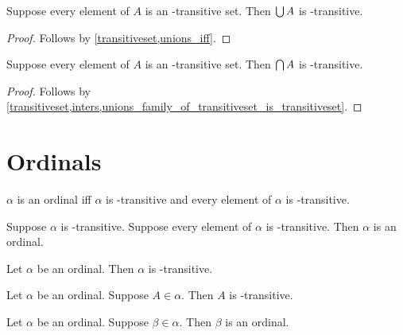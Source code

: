 \begin{proposition}\label{unions_family_of_transitiveset_is_transitiveset}
    Suppose every element of $A$ is an \in-transitive set.
    Then $\bigcup A$ is \in-transitive.
\end{proposition}
\begin{proof}
    Follows by \cref{transitiveset,unions_iff}.
\end{proof}

\begin{proposition}\label{inters_family_of_transitiveset_is_transitiveset}
    Suppose every element of $A$ is an \in-transitive set.
    Then $\bigcap A$ is \in-transitive.
\end{proposition}
\begin{proof}
    Follows by \cref{transitiveset,inters,unions_family_of_transitiveset_is_transitiveset}.
\end{proof}


\section{Ordinals}

\begin{definition}\label{ordinal}
    $\alpha$ is an ordinal iff
    $\alpha$ is \in-transitive and
    every element of $\alpha$ is \in-transitive.
\end{definition}

\begin{proposition}\label{ordinal_intro}
    Suppose $\alpha$ is \in-transitive.
    Suppose every element of $\alpha$ is \in-transitive.
    Then $\alpha$ is an ordinal.
\end{proposition}

\begin{proposition}\label{ordinal_is_transitiveset}
    Let $\alpha$ be an ordinal.
    Then $\alpha$ is \in-transitive.
\end{proposition}

\begin{proposition}\label{ordinal_elem_is_transitiveset}
    Let $\alpha$ be an ordinal.
    Suppose $A\in\alpha$.
    Then $A$ is \in-transitive.
\end{proposition}

\begin{proposition}\label{elem_of_ordinal_is_ordinal}
    Let $\alpha$ be an ordinal.
    Suppose $\beta\in\alpha$.
    Then $\beta$ is an ordinal.
\end{proposition}

